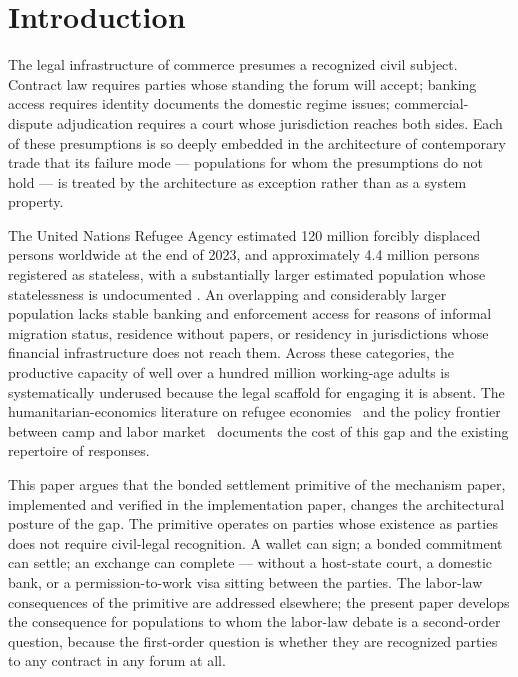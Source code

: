 \documentclass[11pt,a4paper]{article}
\theoremstyle{remark}
\begin{document}
\section{Introduction}
\label{sec:intro}

The legal infrastructure of commerce presumes a recognized civil
subject. Contract law requires parties whose standing the forum
will accept; banking access requires identity documents the
domestic regime issues; commercial-dispute adjudication requires
a court whose jurisdiction reaches both sides. Each of these
presumptions is so deeply embedded in the architecture of
contemporary trade that its failure mode --- populations for whom
the presumptions do not hold --- is treated by the architecture as
exception rather than as a system property.

The United Nations Refugee Agency estimated 120 million forcibly
displaced persons worldwide at the end of 2023, and approximately
4.4 million persons registered as stateless, with a substantially
larger estimated population whose statelessness is undocumented
\citep{unhcr2024globaltrends}. An overlapping and considerably
larger population lacks stable banking and enforcement access for
reasons of informal migration status, residence without papers,
or residency in jurisdictions whose financial infrastructure does
not reach them. Across these categories, the productive capacity
of well over a hundred million working-age adults is
systematically underused because the legal scaffold for engaging
it is absent. The humanitarian-economics literature on refugee
economies~\citep{betts_collier_2017} and the policy frontier
between camp and labor market~\citep{pritchett2006people}
documents the cost of this gap and the existing repertoire of
responses.

This paper argues that the bonded settlement primitive
of the mechanism paper, implemented and verified
in the implementation paper, changes the architectural posture of
the gap. The primitive operates on parties whose existence as
parties does not require civil-legal recognition. A wallet can
sign; a bonded commitment can settle; an exchange can complete ---
without a host-state court, a domestic bank, or a permission-to-work
visa sitting between the parties. The labor-law consequences of
the primitive are addressed elsewhere; the present paper develops the
consequence for populations to whom the labor-law debate is a
second-order question, because the first-order question is
whether they are recognized parties to any contract in any forum
at all.
\end{document}
